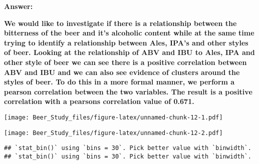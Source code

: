 \documentclass[
]{article}
\newenvironment{Shaded}{\begin{snugshade}}{\end{snugshade}}
\newcommand{\DataTypeTok}[1]{\textcolor[rgb]{0.13,0.29,0.53}{#1}}
\newcommand{\KeywordTok}[1]{\textcolor[rgb]{0.13,0.29,0.53}{\textbf{#1}}}
\newcommand{\NormalTok}[1]{#1}
\newcommand{\OperatorTok}[1]{\textcolor[rgb]{0.81,0.36,0.00}{\textbf{#1}}}
\newcommand{\StringTok}[1]{\textcolor[rgb]{0.31,0.60,0.02}{#1}}
\begin{document}
\textbf{Answer:}

\textbf{We would like to investigate if there is a relationship between
the bitterness of the beer and it's alcoholic content while at the same
time trying to identify a relationship between Ales, IPA's and other
styles of beer. Looking at the relationship of ABV and IBU to Ales, IPA
and other style of beer we can see there is a positive correlation
between ABV and IBU and we can also see evidence of clusters around the
styles of beer. To do this in a more formal manner, we perform a pearson
correlation between the two variables. The result is a positive
correlation with a pearsons correlation value of 0.671.}

\begin{Shaded}
\end{Shaded}

\texttt{[image: Beer\_Study\_files/figure-latex/unnamed-chunk-12-1.pdf]}

\begin{Shaded}
\end{Shaded}

\texttt{[image: Beer\_Study\_files/figure-latex/unnamed-chunk-12-2.pdf]}

\begin{Shaded}
\end{Shaded}

\begin{verbatim}
## `stat_bin()` using `bins = 30`. Pick better value with `binwidth`.
## `stat_bin()` using `bins = 30`. Pick better value with `binwidth`.
\end{verbatim}
\end{document}
